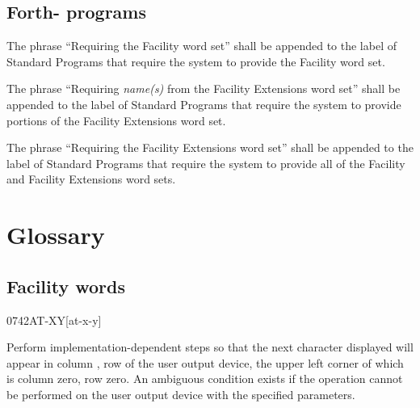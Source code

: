 \subsection{Forth-\snapshot{} programs} %

The phrase ``Requiring the Facility word set'' shall be appended to
the label of Standard Programs that require the system to provide
the Facility word set.

The phrase ``Requiring \emph{name(s)} from the Facility Extensions
word set'' shall be appended to the label of Standard Programs that
require the system to provide portions of the Facility Extensions
word set.

The phrase ``Requiring the Facility Extensions word set'' shall be
appended to the label of Standard Programs that require the system
to provide all of the Facility and Facility Extensions word sets.

\section{Glossary} %

\subsection{Facility words} %

\begin{worddef}{0742}{AT-XY}[at-x-y]
\item {}

	Perform implementation-dependent steps so that the next
	character displayed will appear in column , row
	 of the user output device, the upper left corner
	of which is column zero, row zero. An ambiguous condition exists
	if the operation cannot be performed on the user output device
	with the specified parameters.
\end{worddef}

